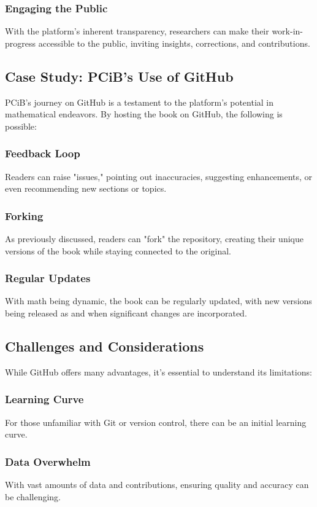 \documentclass[a4paper,12pt]{book}
\begin{document}
\subsubsection*{Engaging the Public}
With the platform's inherent transparency, researchers can make their work-in-progress accessible to the public, inviting insights, corrections, and contributions.

\subsection*{Case Study: PCiB's Use of GitHub}
PCiB's journey on GitHub is a testament to the platform's potential in mathematical endeavors. By hosting the book on GitHub, the following is possible:

\subsubsection*{Feedback Loop}
Readers can raise "issues," pointing out inaccuracies, suggesting enhancements, or even recommending new sections or topics.

\subsubsection*{Forking}
As previously discussed, readers can "fork" the repository, creating their unique versions of the book while staying connected to the original.

\subsubsection*{Regular Updates}
With math being dynamic, the book can be regularly updated, with new versions being released as and when significant changes are incorporated.

\subsection*{Challenges and Considerations}
While GitHub offers many advantages, it's essential to understand its limitations:

\subsubsection*{Learning Curve}
For those unfamiliar with Git or version control, there can be an initial learning curve.

\subsubsection*{Data Overwhelm}
With vast amounts of data and contributions, ensuring quality and accuracy can be challenging.
\end{document}

